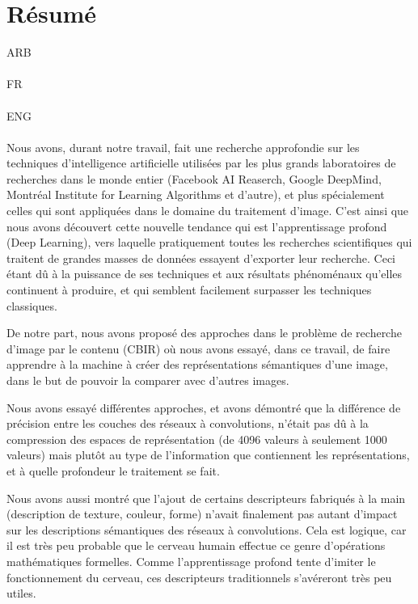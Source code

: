 
\chapter*{Résumé} %

ARB\\\\

FR\\\\

ENG\\\\


Nous avons, durant notre travail, fait une recherche approfondie sur les techniques d'intelligence artificielle utilisées par les plus grands laboratoires de recherches dans le monde entier (Facebook AI Reaserch, Google DeepMind, Montréal Institute for Learning Algorithms et d'autre), et plus spécialement celles qui sont appliquées dans le domaine du traitement d'image. C'est ainsi que nous avons découvert cette nouvelle tendance qui est l'apprentissage profond (Deep Learning), vers laquelle pratiquement toutes les recherches scientifiques qui traitent de grandes masses de données essayent d'exporter leur recherche. Ceci étant dû à la puissance de ses techniques et aux résultats phénoménaux qu'elles continuent à produire, et qui semblent facilement surpasser les techniques classiques.

	De notre part, nous avons proposé des approches dans le problème de recherche d'image par le contenu (CBIR) où nous avons essayé, dans ce travail, de faire apprendre à la machine à créer des représentations sémantiques d'une image, dans le but de pouvoir la comparer avec d'autres images.

	Nous avons essayé différentes approches, et avons démontré que la différence de précision entre les couches des réseaux à convolutions, n’était pas dû à la compression des espaces de représentation (de 4096 valeurs à seulement 1000 valeurs) mais plutôt au type de l'information que contiennent les représentations, et à quelle profondeur le traitement se fait. 

Nous avons aussi montré que l'ajout de certains descripteurs fabriqués à la main (description de texture, couleur, forme) n'avait finalement pas autant d'impact sur les descriptions sémantiques des réseaux à convolutions. Cela est logique, car il est très peu probable que le cerveau humain effectue ce genre d’opérations mathématiques formelles. Comme l'apprentissage profond tente d'imiter le fonctionnement du cerveau, ces descripteurs traditionnels s’avéreront très peu utiles.

